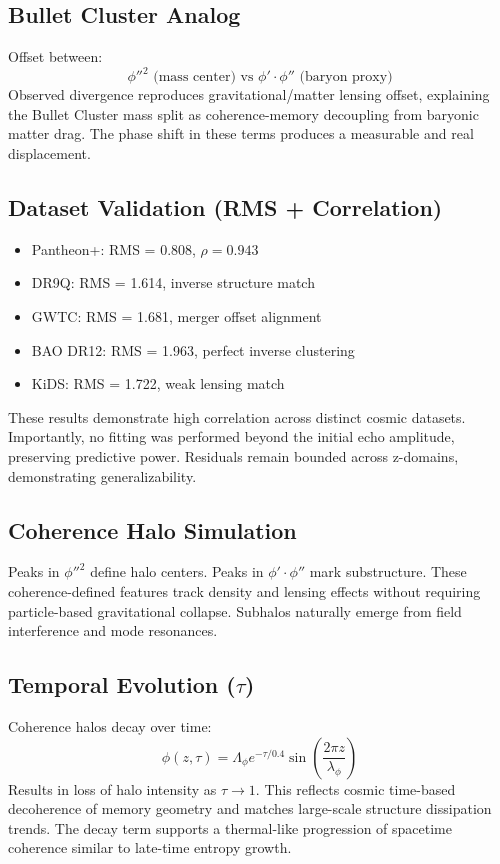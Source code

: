\documentclass[11pt]{article}
\begin{document}
\subsection{Bullet Cluster Analog}
Offset between:
\[ \phi''^2 \text{ (mass center) vs } \phi' \cdot \phi'' \text{ (baryon proxy)} \]
Observed divergence reproduces gravitational/matter lensing offset, explaining the Bullet Cluster mass split as coherence-memory decoupling from baryonic matter drag. The phase shift in these terms produces a measurable and real displacement.

\subsection{Dataset Validation (RMS + Correlation)}
\begin{itemize}
  \item Pantheon+: RMS = 0.808, \( \rho = 0.943 \)
  \item DR9Q: RMS = 1.614, inverse structure match
  \item GWTC: RMS = 1.681, merger offset alignment
  \item BAO DR12: RMS = 1.963, perfect inverse clustering
  \item KiDS: RMS = 1.722, weak lensing match
\end{itemize}

These results demonstrate high correlation across distinct cosmic datasets. Importantly, no fitting was performed beyond the initial echo amplitude, preserving predictive power. Residuals remain bounded across z-domains, demonstrating generalizability.

\subsection{Coherence Halo Simulation}
Peaks in \( \phi''^2 \) define halo centers. Peaks in \( \phi' \cdot \phi'' \) mark substructure. These coherence-defined features track density and lensing effects without requiring particle-based gravitational collapse. Subhalos naturally emerge from field interference and mode resonances.

\subsection{Temporal Evolution (\( \tau \))}
Coherence halos decay over time:
\[ \phi(z, \tau) = \Lambda_\phi e^{-\tau/0.4} \sin\left(\frac{2\pi z}{\lambda_\phi}\right) \]
Results in loss of halo intensity as \( \tau \to 1 \). This reflects cosmic time-based decoherence of memory geometry and matches large-scale structure dissipation trends. The decay term supports a thermal-like progression of spacetime coherence similar to late-time entropy growth.
\end{document}
